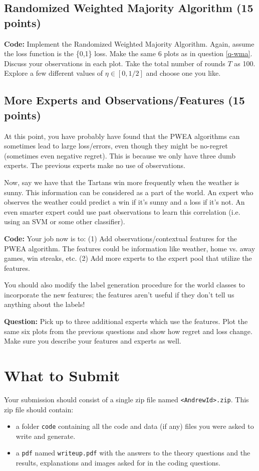 \documentclass{article}
\begin{document}
\subsection{Randomized Weighted Majority Algorithm (15 points)}
\textbf{Code:} Implement the Randomized Weighted Majority Algorithm. Again, assume the loss function is the \{0,1\} loss. Make the same 6 plots as in question \ref{q-wma}. Discuss your observations in each plot. Take the total number of rounds $T$ as 100. Explore a few different values of $\eta \in [0,1/2]$ and choose one you like.

\subsection{More Experts and Observations/Features (15 points)}
At this point, you have probably have found that the PWEA algorithms can sometimes lead to large loss/errors, even though they might be no-regret (sometimes even negative regret). This is because we only have three dumb experts. The previous experts make no use of observations. 

Now, say we have that the Tartans win more frequently when the weather is sunny. This information can be considered as a part of the world. An expert who observes the weather could predict a win if it's sunny and a loss if it's not. An even smarter expert could use past observations to learn this correlation (i.e. using an SVM or some other classifier).

\noindent\textbf{Code:} Your job now is to: (1) Add observations/contextual features for the PWEA algorithm. The features could be information like weather, home vs. away games, win streaks, etc. (2) Add more experts to the expert pool that utilize the features.

You should also modify the label generation procedure for the world classes to incorporate the new features; the features aren't useful if they don't tell us anything about the labels!

\noindent\textbf{Question:} Pick up to three additional experts which use the features. Plot the same six plots from the previous questions and show how regret and loss change. Make sure you describe your features and experts as well.

\section{What to Submit}\label{sec:wts}

Your submission should consist of a single zip file named {\tt<AndrewId>.zip}. This zip file should contain:

\begin{itemize}
    \item a folder {\tt code} containing all the code and data (if any) files you were asked to write and generate.

    \item a \texttt{pdf} named {\tt writeup.pdf} with the answers to the theory questions and the results, explanations and images asked for in the coding questions.

\end{itemize}
\end{document}
